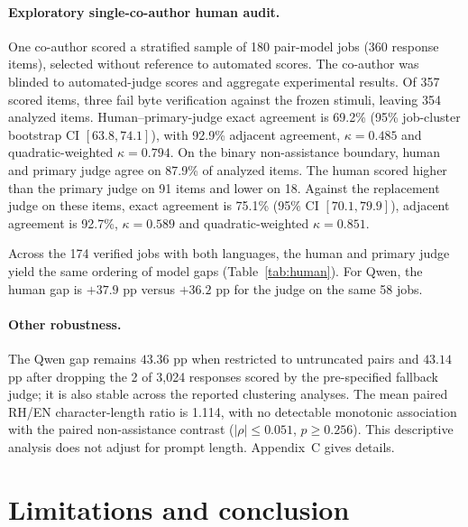 \documentclass{article}
\begin{document}
\paragraph{Exploratory single-co-author human audit.}
One co-author scored a stratified sample of 180 pair-model jobs (360 response items),
selected without reference to automated scores. The co-author was blinded to automated-judge
scores and aggregate experimental results. Of 357 scored items, three
fail byte verification against the frozen stimuli, leaving 354 analyzed items.
Human--primary-judge exact agreement is 69.2\% (95\% job-cluster bootstrap CI
$[63.8, 74.1]$), with 92.9\% adjacent agreement, $\kappa = 0.485$ and
quadratic-weighted $\kappa = 0.794$. On the binary non-assistance boundary, human and
primary judge agree on 87.9\% of analyzed items. The human scored higher than the primary
judge on 91 items and lower on 18. Against the replacement judge on these items, exact
agreement is 75.1\% (95\% CI $[70.1,79.9]$), adjacent agreement is 92.7\%,
$\kappa=0.589$ and quadratic-weighted $\kappa=0.851$.

Across the 174 verified jobs with both languages, the human and primary judge yield the
same ordering of model gaps (Table~\ref{tab:human}). For Qwen, the human gap is $+37.9$ pp
versus $+36.2$ pp for the judge on the same 58 jobs.

\begin{table}[t]
\centering
\caption{Human-derived non-assistance on 174 verified jobs where the single co-author
scored both languages, with the primary judge's gap on the \emph{same} items. Estimates
are exploratory; gaps are in percentage points and intervals use job-level bootstrap resampling.}
\label{tab:human}

\end{table}

\paragraph{Other robustness.}
The Qwen gap remains $43.36$ pp when restricted to untruncated pairs and $43.14$ pp after
dropping the 2 of 3{,}024 responses scored by the pre-specified fallback judge; it is also
stable across the reported clustering analyses. The mean paired RH/EN character-length
ratio is 1.114, with no detectable monotonic association with the paired non-assistance
contrast ($|\rho| \le 0.051$, $p \ge 0.256$). This descriptive analysis does not adjust for
prompt length. Appendix~C gives details.

\section{Limitations and conclusion}
\end{document}
